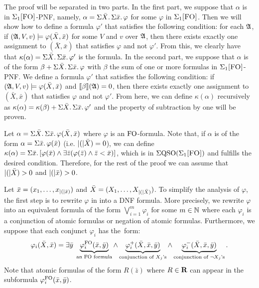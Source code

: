 The proof will be separated in two parts. In the first part, we suppose that  $\alpha$ is in $\Sigma_{1}\textsc{[FO]}$-PNF, namely, $\alpha = \Sigma{\bar{X}}.\,\Sigma{\bar{x}}.\,\varphi$ for some $\varphi$ in $\Sigma_{1}\textsc{[FO]}$. Then we will show how to define a formula $\varphi'$ that satisfies the following condition: for each $\mathfrak{A}$, if $(\mathfrak{A},V,v)\models \varphi(\bar{X},\bar{x})$ for some $V$ and $v$ over $\mathfrak{A}$, then there exists exactly one assignment to $(\bar{X},\bar{x})$ that satisfies $\varphi$ and not $\varphi'$. 
From this, we clearly have that $\kappa(\alpha) = \Sigma{\bar{X}}.\,\Sigma{\bar{x}}.\,\varphi'$ is the formula. In the second part, we suppose that $\alpha$ is of the form $\beta + \Sigma{\bar{X}}.\,\Sigma{\bar{x}}.\,\varphi$ with $\beta$ the sum of one or more formulas in $\Sigma_{1}\textsc{[FO]}$-PNF. 
We define a formula $\varphi'$ that satisfies the following condition: if $(\mathfrak{A},V,v)\models \varphi(\bar{X},\bar{x})$ and ${\llbracket{}{\beta}\rrbracket}(\mathfrak{A}) = 0$, then there exists exactly one assignment to $(\bar{X},\bar{x})$ that satisfies $\varphi$ and not $\varphi'$. From here, we can define $\kappa(\alpha)$ recursively as  $\kappa(\alpha) = \kappa(\beta) +  \Sigma{\bar{X}}.\,\Sigma{\bar{x}}.\,\varphi'$ and the property of subtraction by one will be proven.

\vspace{1em}

  Let $\alpha =  \Sigma{\bar{X}}.\,\Sigma{\bar{x}}.\, \varphi(\bar{X},\bar{x})$ where $\varphi$ is an  ${\rm FO}$-formula.
Note that, if $\alpha$ is of the form $\alpha = \Sigma{\bar{x}}.\, \varphi(\bar{x})$ (i.e. $\vert ( \vert\bar{X}) = 0$), we can define $\kappa(\alpha) = \Sigma{\bar{x}}.\, [\varphi(\bar{x})\wedge\exists\bar{z}(\varphi(\bar{z})\wedge\bar{z} < \bar{x})]$, which is in $\Sigma{\rm QSO}(\Sigma_{1}\textsc{[FO]})$ and fulfills the desired condition. 
Therefore, for the rest of the proof we can assume that $\vert ( \vert\bar{X}) > 0$ and $\vert ( \vert\bar{x}) > 0$.

 Let $\bar{x} = (x_1,\ldots,x_{\vert ( \vert\bar{x})})$ and $\bar{X} = (X_1,\ldots,X_{\vert ( \vert\bar{X})})$.
To simplify the analysis of $\varphi$, the first step is to rewrite $\varphi$ in into a DNF formula. 
More precisely, we rewrite $\varphi$ into an equivalent formula of the form $\bigvee_{i = 1}^m \varphi_i$ for some $m\in \mathbb{N}$ where each $\varphi_i$ is a conjunction of atomic formulas or negation of atomic formulas. 
Furthermore, we suppose that each conjunct $\varphi_i$ has the~form:
$$
\varphi_i(\bar{X},\bar{x}) = \exists \bar{y} \; \underbrace{\varphi_i^{{\rm FO}}(\bar{x},\bar{y})}_{\text{an ${\rm FO}$ formula}} \wedge 
\underbrace{\varphi_i^{+}(\bar{X},\bar{x},\bar{y})}_{\text{conjunction of $X_j$'s}} \wedge
\underbrace{\varphi_i^{-}(\bar{X},\bar{x},\bar{y})}_{\text{conjunction of $\neg X_j$'s}}.
$$
Note that atomic formulas of the form $R(\bar{z})$ where $R \in \mathbf{R}$ can appear in the subformula $\varphi_i^{{\rm FO}}(\bar{x},\bar{y})$.

